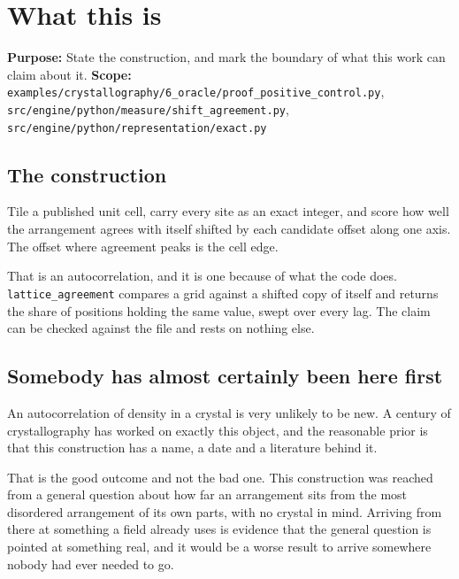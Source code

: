 \chapter{What this is}

\textbf{Purpose:} State the construction, and mark the boundary of what this work can claim about it.
\textbf{Scope:} \texttt{examples/\allowbreak{}crystallography/\allowbreak{}6\_\allowbreak{}oracle/\allowbreak{}proof\_\allowbreak{}positive\_\allowbreak{}control.\allowbreak{}py}, \texttt{src/\allowbreak{}engine/\allowbreak{}python/\allowbreak{}measure/\allowbreak{}shift\_\allowbreak{}agreement.\allowbreak{}py}, \texttt{src/\allowbreak{}engine/\allowbreak{}python/\allowbreak{}representation/\allowbreak{}exact.\allowbreak{}py}

\section{The construction}

Tile a published unit cell, carry every site as an exact integer, and score how well the arrangement agrees with itself shifted by each candidate offset along one axis. The offset where agreement peaks is the cell edge.

That is an autocorrelation, and it is one because of what the code does. \texttt{lattice\_\allowbreak{}agreement} compares a grid against a shifted copy of itself and returns the share of positions holding the same value, swept over every lag. The claim can be checked against the file and rests on nothing else.

\section{Somebody has almost certainly been here first}

An autocorrelation of density in a crystal is very unlikely to be new. A century of crystallography has worked on exactly this object, and the reasonable prior is that this construction has a name, a date and a literature behind it.

That is the good outcome and not the bad one. This construction was reached from a general question about how far an arrangement sits from the most disordered arrangement of its own parts, with no crystal in mind. Arriving from there at something a field already uses is evidence that the general question is pointed at something real, and it would be a worse result to arrive somewhere nobody had ever needed to go.

